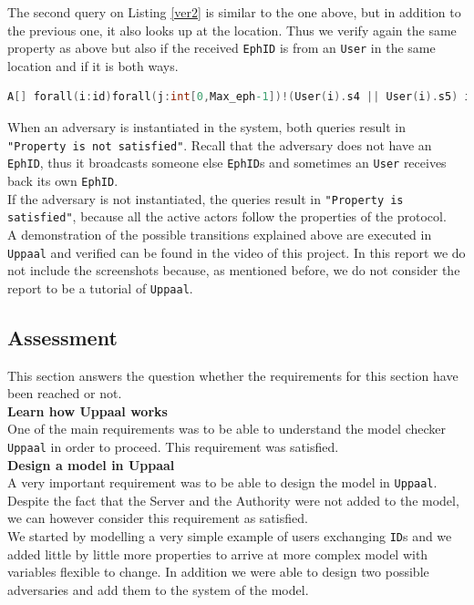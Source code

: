 \documentclass[a4paper, twocolumn]{article}
\begin{document}
\noindent The second query on Listing \ref{ver2} is similar to the one above, but in addition to the previous one, it also looks up at the location. Thus we verify again the same property as above but also if the received \texttt{EphID} is from an \texttt{User} in the same location and if it is both ways.
\begin{lstlisting}[language=C, caption= Strong Verifier,label={ver2}]
A[] forall(i:id)forall(j:int[0,Max_eph-1])!(User(i).s4 || User(i).s5) imply (User(i).r_token[j] imply(exists(k:int[0,numEph-1])(User(j/numEph+1).r_token[(i-1)*numEph+k]&&  User(i).r_loc[j] == User(j/numEph+1).r_loc[(i-1)*numEph+k])))
\end{lstlisting} 

\noindent When an adversary is instantiated in the system, both queries result in \texttt{"Property is not satisfied"}. Recall that the adversary does not have an \texttt{EphID}, thus it broadcasts someone else \texttt{EphID}s and sometimes an \texttt{User} receives back its own \texttt{EphID}.\\
If the adversary is not instantiated, the queries result in \texttt{"Property is satisfied"}, because all the active actors follow the properties of the protocol.\\

\noindent A demonstration of the possible transitions explained above are executed in \texttt{Uppaal} and verified can be found in the video of this project. In this report we do not include the screenshots because, as mentioned before, we do not consider the report to be a tutorial of \texttt{Uppaal}.
\subsection{Assessment}
This section answers the question whether the requirements for this section have been reached or not.\\

\noindent\textbf{Learn how Uppaal works}\\
One of the main requirements was to be able to understand the model checker \texttt{Uppaal} in order to proceed. This requirement was satisfied.\\

\noindent\textbf{Design a model in Uppaal}\\
A very important requirement was to be able to design the model in \texttt{Uppaal}. Despite the fact that the Server and the Authority were not added to the model, we can however consider this requirement as satisfied.\\
We started by modelling a very simple example of users exchanging \texttt{ID}s and we added little by little more properties to arrive at more complex model with variables flexible to change. In addition we were able to design two possible adversaries and add them to the system of the model.\\
\end{document}
